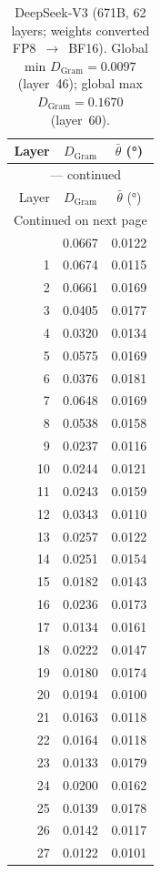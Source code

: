 \begin{longtable}{rcc}
\caption{DeepSeek-V3 (671B, 62 layers; weights converted FP8~$\to$~BF16).
         Global min $D_\text{Gram} = 0.0097$ (layer~46);
         global max $D_\text{Gram} = 0.1670$ (layer~60).}
\label{tab:v3-layers} \\
\toprule
Layer & $D_\text{Gram}$ & $\bar\theta$ (°) \\
\midrule
\endfirsthead
\multicolumn{3}{c}{\tablename~\thetable{} --- continued} \\
\toprule
Layer & $D_\text{Gram}$ & $\bar\theta$ (°) \\
\midrule
\endhead
\midrule
\multicolumn{3}{r}{Continued on next page} \\
\endfoot
\bottomrule
\endlastfoot
 0 & 0.0667 & 0.0122 \\
 1 & 0.0674 & 0.0115 \\
 2 & 0.0661 & 0.0169 \\
 3 & 0.0405 & 0.0177 \\
 4 & 0.0320 & 0.0134 \\
 5 & 0.0575 & 0.0169 \\
 6 & 0.0376 & 0.0181 \\
 7 & 0.0648 & 0.0169 \\
 8 & 0.0538 & 0.0158 \\
 9 & 0.0237 & 0.0116 \\
10 & 0.0244 & 0.0121 \\
11 & 0.0243 & 0.0159 \\
12 & 0.0343 & 0.0110 \\
13 & 0.0257 & 0.0122 \\
14 & 0.0251 & 0.0154 \\
15 & 0.0182 & 0.0143 \\
16 & 0.0236 & 0.0173 \\
17 & 0.0134 & 0.0161 \\
18 & 0.0222 & 0.0147 \\
19 & 0.0180 & 0.0174 \\
20 & 0.0194 & 0.0100 \\
21 & 0.0163 & 0.0118 \\
22 & 0.0164 & 0.0118 \\
23 & 0.0133 & 0.0179 \\
24 & 0.0200 & 0.0162 \\
25 & 0.0139 & 0.0178 \\
26 & 0.0142 & 0.0117 \\
27 & 0.0122 & 0.0101 \\

\end{longtable}
